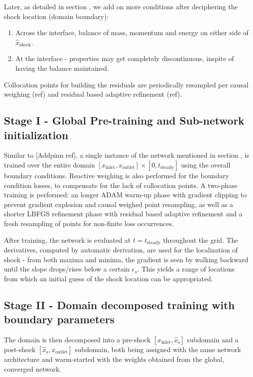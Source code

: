 Later, as detailed in section , we add on more conditions after deciphering the shock location (domain boundary):

\begin{enumerate}
    \item Across the interface, balance of mass, momentum and energy on either side of $\hat{x}_\text{shock}$.
    \item At the interface - properties may get completely discontinuous, inspite of having the balance maintained.
\end{enumerate}

Collocation points for building the residuals are periodically resampled per causal weighing (ref) and residual based adaptive refinement (ref).

\subsection{Stage I - Global Pre-training and Sub-network initialization}
\label{subsec:stage-1-global-pretrain-and-subnet-init}

Similar to [Addpinn ref], a single instance of the network mentioned in section , is trained over the entire domain $[x_\text{inlet}, x_\text{outlet}] \times [0, t_\text{steady}]$ using the overall boundary conditions. Reactive weighing is also performed for the boundary condition losses, to compensate for the lack of collocation points. A two-phase training is performed: an longer ADAM warm-up phase with gradient clipping to prevent gradient explosion and causal weighed point resampling, as well as a shorter LBFGS refinement phase with residual based adaptive refinement and a fresh resampling of points for non-finite loss occurrences.

After training, the network is evaluated at $t = t_\text{steady}$ throughout the grid. The derivatives, computed by automatic derivation, are used for the localization of shock - from both maxima and minima, the gradient is seen by walking backward until the slope drops/rises below a certain $\epsilon_s$. This yields a range of locations from which an initial guess of the shock location can be appropriated.

\subsection{Stage II - Domain decomposed training with boundary parameters}

The domain is then decomposed into a pre-shock $[x_\text{inlet}, \hat{x}_\text{s}]$ subdomain and a post-shock $[\hat{x}_\text{s}, x_\text{outlet}]$ subdomain, both being assigned with the same network architecture and warm-started with the weights obtained from the global, converged network.

